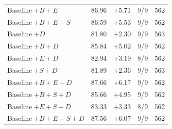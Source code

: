 \documentclass[12pt,a4paper]{article}
\begin{document}
\begin{longtable}{@{}lrrrr@{}}
Baseline $+B+E$ & 86.96 & +5.71 & 9/9 & 562 \\
Baseline $+B+E+S$ & 86.59 & +5.53 & 9/9 & 562 \\
Baseline $+D$ & 81.80 & +2.30 & 9/9 & 563 \\
Baseline $+B+D$ & 85.84 & +5.02 & 9/9 & 562 \\
Baseline $+E+D$ & 82.94 & +3.19 & 8/9 & 562 \\
Baseline $+S+D$ & 81.89 & +2.36 & 9/9 & 563 \\
Baseline $+B+E+D$ & 87.66 & +6.17 & 9/9 & 562 \\
Baseline $+B+S+D$ & 85.66 & +4.95 & 9/9 & 562 \\
Baseline $+E+S+D$ & 83.33 & +3.33 & 8/9 & 562 \\
Baseline $+B+E+S+D$ & 87.56 & +6.07 & 9/9 & 562 \\
\end{longtable}\endgroup
\end{document}
